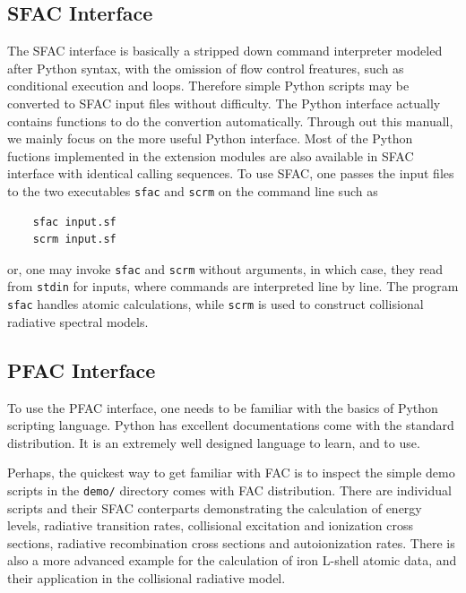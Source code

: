 \documentclass[twoside,letterpaper]{refrep}
\begin{document}
\subsection{SFAC Interface}
The SFAC interface is basically a stripped down command interpreter modeled
after Python syntax, with the omission of flow control freatures, such as
conditional execution and loops. Therefore simple Python scripts may be
converted to SFAC input files without difficulty. The Python interface
actually contains functions to do the convertion automatically. Through out
this manuall, we mainly focus on the more useful Python interface. Most of the
Python fuctions implemented in the extension modules are also available in
SFAC interface with identical calling sequences. To use SFAC, one passes the
input files to the two executables \verb|sfac| and \verb|scrm| on the command
line such as 
\begin{verbatim}
    sfac input.sf
    scrm input.sf
\end{verbatim}
or, one may invoke \verb|sfac| and \verb|scrm| without arguments, in which
case, they read from \verb|stdin| for inputs, where commands are interpreted
line by line. The program \verb|sfac| handles atomic calculations, while
\verb|scrm| is used to construct collisional radiative spectral models.

\subsection{PFAC Interface}
To use the PFAC interface, one needs to be familiar with the basics of Python
scripting language. Python has excellent documentations come with the standard
distribution. It is an extremely well designed language to learn, and to use.

Perhaps, the quickest way to get familiar with FAC is to inspect the simple
demo scripts in the \verb|demo/| directory comes with FAC distribution. There
are individual scripts and their SFAC conterparts demonstrating the
calculation of energy levels, radiative transition rates, collisional
excitation and ionization cross sections, radiative recombination cross
sections and autoionization rates. There is also a more advanced example for
the calculation of iron L-shell atomic data, and their application in the
collisional radiative model.
\end{document}
